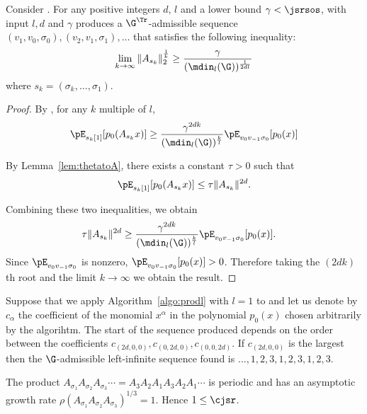 \documentclass[11pt,twoside,a4paper,openright]{uclouvain-thesis}
\begin{document}
\begin{mytheo}
  \label{theo:fourth}
  Consider .
  For any positive integers $d$, $l$ and
  a lower bound $\gamma < \jsrsos$,
   with input $l, d$ and $\gamma$
  produces a $\G^\Tr$-admissible sequence
  $(v_1,v_0,\sigma_0), (v_2,v_1,\sigma_1), \ldots$ %
  that satisfies the following inequality:
  \begin{equation*}
    \lim_{k \to \infty} \|A_{s_k}\|_2^\frac{1}{k} \geq \frac{\gamma}{(\mdin_l(\G))^\frac{1}{2dl}}
  \end{equation*}
  where $s_k = (\sigma_k, \ldots, \sigma_1)$.
  \begin{proof}
    By , for any $k$ multiple of $l$, %
    \begin{equation*}
      \pE_{s_k[1]}[p_0(A_{s_k}x)] \geq \frac{\gamma^{2dk}}{(\mdin_l(\G))^\frac{k}{l}} \pE_{v_0v_{-1}\sigma_0}[p_0(x)]
    \end{equation*}

    By Lemma~\ref{lem:thetatoA},
    there exists a constant $\tau > 0$ such that
    \[
      \pE_{s_k[1]}[p_0(A_{s_k} x)] \leq \tau \|A_{s_k}\|^{2d}.
    \]

    Combining these two inequalities, we obtain
    \begin{align*}
      \tau \|A_{s_k}\|^{2d} & \geq \frac{\gamma^{2dk}}{(\mdin_l(\G))^\frac{k}{l}} \pE_{v_0v_{-1}\sigma_0}[p_0(x)].
    \end{align*}
    Since $\pE_{v_0v_{-1}\sigma_0}$ is nonzero, $\pE_{v_0v_{-1}\sigma_0}[p_0(x)] > 0$.
    Therefore taking the $(2dk)$th root and the limit $k \to \infty$
    we obtain the result.
  \end{proof}
\end{mytheo}




\begin{myexem}
  \label{exem:simple3}
  Suppose that we apply Algorithm~\ref{algo:prodl} with $l = 1$ to 
  and let us denote by $c_\alpha$ the coefficient of the monomial $x^\alpha$ in the polynomial $p_0(x)$ chosen arbitrarily by the algorihtm.
  The start of the sequence produced depends on the order between
  the coefficients $c_{(2d,0,0)},\allowbreak c_{(0,2d,0)},\allowbreak c_{(0,0,2d)}$.
  If $c_{(2d,0,0)}$ is the largest then
  the $\G$-admissible left-infinite sequence found is
  \( \ldots,1,2,3,1,2,3,1,2,3. \)

  The product $A_{\sigma_1} A_{\sigma_2} A_{\sigma_3} \cdots = A_3A_2A_1A_3A_2A_1 \cdots $
  is periodic and has an asymptotic growth rate $\rho(A_{\sigma_1}A_{\sigma_2}A_{\sigma_3})^{1/3}\allowbreak = 1$.
  Hence $1 \leq \cjsr$.
\end{myexem}
\end{document}
